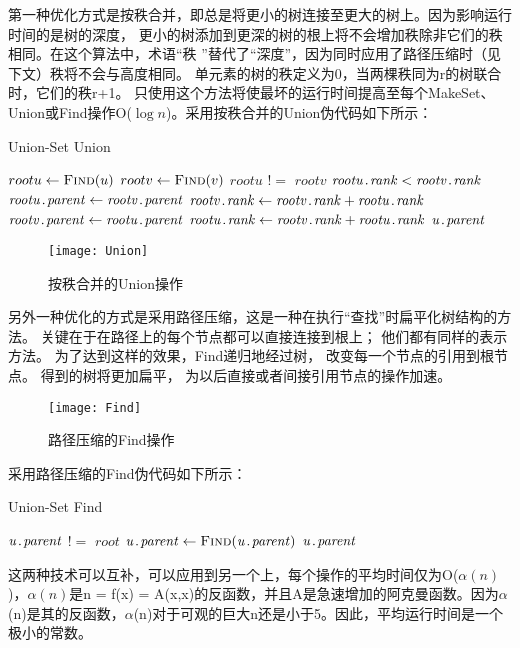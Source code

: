 第一种优化方式是按秩合并，即总是将更小的树连接至更大的树上。因为影响运行时间的是树的深度，
更小的树添加到更深的树的根上将不会增加秩除非它们的秩相同。在这个算法中，术语“秩
”替代了“深度”，因为同时应用了路径压缩时（见下文）秩将不会与高度相同。
单元素的树的秩定义为0，当两棵秩同为r的树联合时，它们的秩r+1。
只使用这个方法将使最坏的运行时间提高至每个MakeSet、
Union或Find操作O($\log n$)。采用按秩合并的Union伪代码如下所示：
\begin{algorithm} 
	\caption {Union-Set Union} 
	\begin{codebox}
\li			$rootu \leftarrow \textnormal{\scshape Find}(u)$
\li			$rootv \leftarrow \textnormal{\scshape Find}(v)$
\li			\If	$rootu$ $!=$ $rootv$
\li				\Then
					\If $\attribii{rootu}{rank} < \attribii{rootv}{rank}$
\li						\Then
							$\attribii{rootu}{parent} \leftarrow \attribii{rootv}{parent}$
\li							$\attribii{rootv}{rank} \leftarrow \attribii{rootv}{rank} + \attribii{rootu}{rank}$
\li						\Else
\li							$\attribii{rootv}{parent} \leftarrow \attribii{rootu}{parent}$
\li							$\attribii{rootu}{rank} \leftarrow  \attribii{rootv}{rank} + \attribii{rootu}{rank}$
						\End
				\End
\li			\Return	$\attribii{u}{parent}$
	\end{codebox}
\end{algorithm} 
\begin{figure}[htbp]
\centering\texttt{[image: Union]}
\caption{按秩合并的Union操作}\label{fig:DAG}
\end{figure}
另外一种优化的方式是采用路径压缩，这是一种在执行“查找”时扁平化树结构的方法。
关键在于在路径上的每个节点都可以直接连接到根上；
他们都有同样的表示方法。
为了达到这样的效果，Find递归地经过树，
改变每一个节点的引用到根节点。
得到的树将更加扁平，
为以后直接或者间接引用节点的操作加速。
\begin{figure}[htbp]
\centering\texttt{[image: Find]}
\caption{路径压缩的Find操作}\label{fig:DAG}
\end{figure}
采用路径压缩的Find伪代码如下所示：
\begin{algorithm} 
	\caption {Union-Set Find} 
	\begin{codebox}
		\Procname{$\proc{Find}(u)$}
\li			\If $\attribii{u}{parent}$ $!=$ $root$
\li			\Then	$\attribii{u}{parent} \leftarrow \proc{Find}(\attribii{u}{parent})$ \End
\li			\Return	$\attribii{u}{parent}$
	\end{codebox}
\end{algorithm} 

这两种技术可以互补，可以应用到另一个上，每个操作的平均时间仅为O($\alpha(n)$)，$\alpha(n)$是n = f(x) = A(x,x)的反函数，并且A是急速增加的阿克曼函数。因为$\alpha$(n)是其的反函数，$\alpha$(n)对于可观的巨大n还是小于5。因此，平均运行时间是一个极小的常数。

